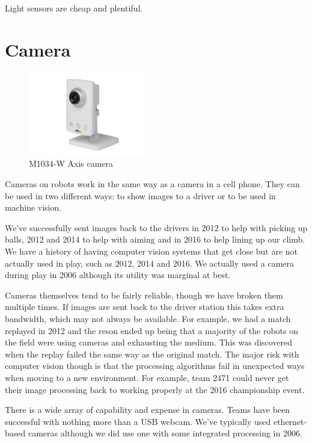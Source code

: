 \documentclass{article}
\begin{document}
Light sensors are cheap and plentiful.

\section{Camera}

\begin{figure}[ht]
\centering
\includegraphics[width=2in]{M1034-W_axis_camera_large_2.jpg}
\caption{M1034-W Axis camera}
\end{figure}

Cameras on robots work in the same way as a camera in a cell phone.  They can be used in two different ways: to show images to a driver or to be used in machine vision.  

We've successfully sent images back to the drivers in 2012 to help with picking up balls, 2012 and 2014 to help with aiming and in 2016 to help lining up our climb.  We have a history of having computer vision systems that get close but are not actually used in play, such as 2012, 2014 and 2016.  We actually used a camera during play in 2006 although its utility was marginal at best.  

Cameras themselves tend to be fairly reliable, though we have broken them multiple times.  If images are sent back to the driver station this takes extra bandwidth, which may not always be available.  For example, we had a match replayed in 2012 and the reson ended up being that a majority of the robots on the field were using cameras and exhausting the medium.  This was discovered when the replay failed the same way as the original match.  The major risk with computer vision though is that the processing algorithms fail in unexpected ways when moving to a new environment.  For example, team 2471 could never get their image processing back to working properly at the 2016 championship event.  

There is a wide array of capability and expense in cameras.  Teams have been successful with nothing more than a USB webcam.  We've typically used ethernet-based cameras although we did use one with some integrated processing in 2006.  
\end{document}
